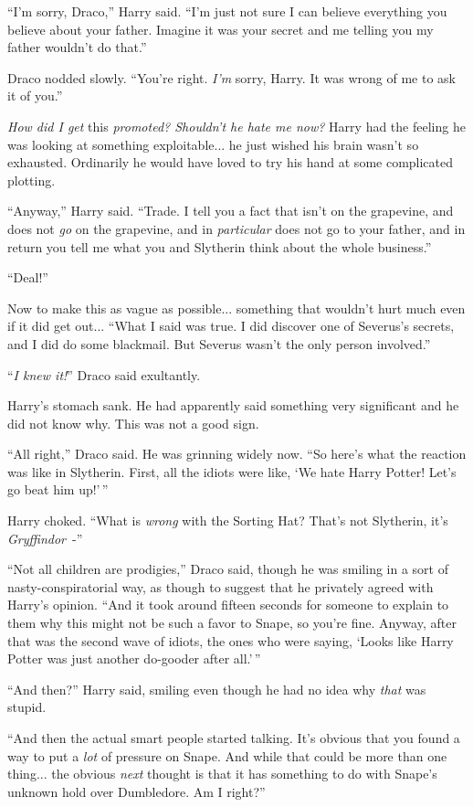 ``I'm sorry, Draco,'' Harry said. ``I'm just not sure I can believe everything you believe about your father. Imagine it was your secret and me telling you my father wouldn't do that.''

Draco nodded slowly. ``You're right. \emph{I'm} sorry, Harry. It was wrong of me to ask it of you.''

\emph{How did I get} this \emph{promoted? Shouldn't he hate me now?} Harry had the feeling he was looking at something exploitable... he just wished his brain wasn't so exhausted. Ordinarily he would have loved to try his hand at some complicated plotting.

``Anyway,'' Harry said. ``Trade. I tell you a fact that isn't on the grapevine, and does not \emph{go} on the grapevine, and in \emph{particular} does not go to your father, and in return you tell me what you and Slytherin think about the whole business.''

``Deal!''

Now to make this as vague as possible... something that wouldn't hurt much even if it did get out... ``What I said was true. I did discover one of Severus's secrets, and I did do some blackmail. But Severus wasn't the only person involved.''

``\emph{I knew it!}'' Draco said exultantly.

Harry's stomach sank. He had apparently said something very significant and he did not know why. This was not a good sign.

``All right,'' Draco said. He was grinning widely now. ``So here's what the reaction was like in Slytherin. First, all the idiots were like, `We hate Harry Potter! Let's go beat him up!'\,''

Harry choked. ``What is \emph{wrong} with the Sorting Hat? That's not Slytherin, it's \emph{Gryffindor}~-''

``Not all children are prodigies,'' Draco said, though he was smiling in a sort of nasty-conspiratorial way, as though to suggest that he privately agreed with Harry's opinion. ``And it took around fifteen seconds for someone to explain to them why this might not be such a favor to Snape, so you're fine. Anyway, after that was the second wave of idiots, the ones who were saying, `Looks like Harry Potter was just another do-gooder after all.'\,''

``And then?'' Harry said, smiling even though he had no idea why \emph{that} was stupid.

``And then the actual smart people started talking. It's obvious that you found a way to put a \emph{lot} of pressure on Snape. And while that could be more than one thing... the obvious \emph{next} thought is that it has something to do with Snape's unknown hold over Dumbledore. Am I right?''

